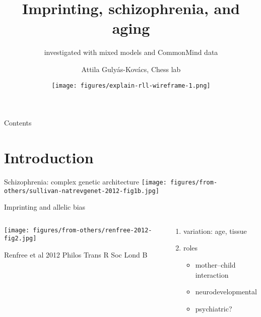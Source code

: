 \documentclass[usenames,dvipsnames]{beamer} %
\title{Imprinting, schizophrenia, and aging}
\subtitle{investigated with mixed models and CommonMind data}
\author{Attila Guly\'{a}s-Kov\'{a}cs, Chess lab}
\date{\texttt{[image: figures/explain-rll-wireframe-1.png]}}
\begin{document}
\begin{frame}[plain, label=title]
\maketitle
\end{frame}

\begin{frame}{Contents}
\tableofcontents
\end{frame}

\section{Introduction}

\begin{frame}{Schizophrenia: complex genetic architecture}
\texttt{[image: figures/from-others/sullivan-natrevgenet-2012-fig1b.jpg]}
\end{frame}

\begin{frame}{Imprinting and allelic bias}
\begin{columns}[t]
\begin{column}{0.5\textwidth}

\texttt{[image: figures/from-others/renfree-2012-fig2.jpg]}

{\tiny Renfree et al 2012 Philos Trans R Soc Lond B}
\end{column}

\begin{column}{0.5\textwidth}
\begin{enumerate}
\item variation: age, tissue
\item roles
\begin{itemize}
\item mother--child interaction
\item neurodevelopmental 
\item psychiatric?
\end{itemize}
\end{enumerate}
\end{column}
\end{columns}
\end{frame}
\end{document}
